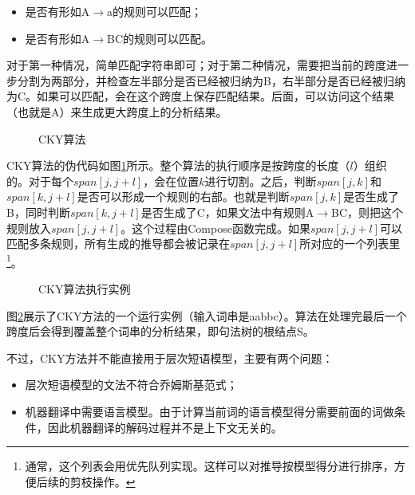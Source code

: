\begin{itemize}
\vspace{0.5em}
\item 	是否有形如A$\to$a的规则可以匹配；
\vspace{0.5em}
\item 	是否有形如A$\to$BC的规则可以匹配。
\vspace{0.5em}
\end{itemize}

\parinterval 对于第一种情况，简单匹配字符串即可；对于第二种情况，需要把当前的跨度进一步分割为两部分，并检查左半部分是否已经被归纳为B，右半部分是否已经被归纳为C。如果可以匹配，会在这个跨度上保存匹配结果。后面，可以访问这个结果（也就是A）来生成更大跨度上的分析结果。

\begin{figure}[htp]
\centering

\caption{CKY算法}
\label{fig:8-9}
\end{figure}

\parinterval CKY算法的伪代码如图\ref{fig:8-9}所示。整个算法的执行顺序是按跨度的长度（$l$）组织的。对于每个$span[j,j + l]$，会在位置$k$进行切割。之后，判断$span[j,k]$和$span[k,j +l]$是否可以形成一个规则的右部。也就是判断$span[j,k]$是否生成了B，同时判断$span[k,j + l]$是否生成了C，如果文法中有规则A$\to$BC，则把这个规则放入$span[j,j+l]$。这个过程由Compose函数完成。如果$span[j,j + l]$可以匹配多条规则，所有生成的推导都会被记录在$span[j,j + l]$所对应的一个列表里\footnote[6]{通常，这个列表会用优先队列实现。这样可以对推导按模型得分进行排序，方便后续的剪枝操作。}。

\begin{figure}[t]
\centering


\caption{CKY算法执行实例}
\label{fig:8-10}
\end{figure}

\parinterval 图\ref{fig:8-10}展示了CKY方法的一个运行实例（输入词串是aabbc）。算法在处理完最后一个跨度后会得到覆盖整个词串的分析结果，即句法树的根结点S。

\parinterval 不过，CKY方法并不能直接用于层次短语模型，主要有两个问题：

\begin{itemize}
\vspace{0.5em}
\item 层次短语模型的文法不符合乔姆斯基范式；
\vspace{0.5em}
\item 机器翻译中需要语言模型。由于计算当前词的语言模型得分需要前面的词做条件，因此机器翻译的解码过程并不是上下文无关的。
\vspace{0.5em}
\end{itemize}

